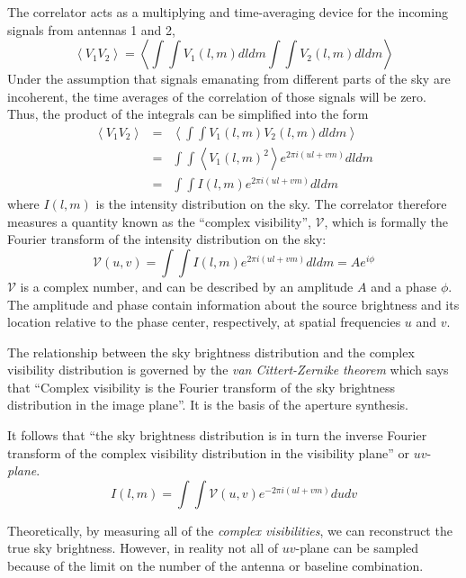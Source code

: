 The correlator acts as a multiplying and time-averaging device for the incoming signals from antennas 1 and 2,
$$\left\langle V_1 V_2 \right\rangle = \left\langle \int\int V_1 (l,m) dl dm  \int\int V_2 (l,m) dl dm \right\rangle$$
Under the assumption that signals emanating from different parts of the sky are incoherent, the time averages of the correlation of those signals will be zero. Thus, the product of the integrals can be simplified into the form 
\begin{eqnarray}
\left\langle V_1 V_2 \right\rangle &=& \left\langle \int\int V_1 (l,m) V_2 (l,m) dl dm \right\rangle \\
&=& \int\int \left\langle V_1 (l,m)^2 \right\rangle e^{2 \pi i (ul + vm)} dl dm \\
&=& \int\int I(l, m) e^{2 \pi i (ul + vm)} dl dm 
\end{eqnarray}
where $I(l, m)$ is the intensity distribution on the sky. The correlator therefore measures a quantity known as the ``complex visibility'', $\mathcal{V}$, which is formally the Fourier transform of the intensity distribution on the sky:
\begin{equation}
\mathcal{V}(u,v) = \int \int I(l, m) e^{2 \pi i (ul + vm)} dl dm = A e^{i\phi}
\end{equation}
$\mathcal{V}$ is a complex number, and can be described by an amplitude $A$ and a phase $\phi$. The amplitude and phase contain information about the source brightness and its location relative to the phase center, respectively, at spatial frequencies $u$ and $v$.

The relationship between the sky brightness distribution and the complex visibility distribution is governed by the \textit{van Cittert-Zernike theorem} which says that ``Complex visibility is the Fourier transform of the sky brightness distribution in the image plane''. It is the basis of the aperture synthesis.

It follows that ``the sky brightness distribution is in turn the inverse Fourier transform of the complex visibility distribution in the visibility plane'' or $uv$-\textit{plane}.
\begin{equation*}
I(l, m) = \int \int \mathcal{V}(u, v) e^{-2 \pi i (ul + vm)} du dv 
\end{equation*}

Theoretically, by measuring all of the \textit{complex visibilities}, we can reconstruct the true sky brightness. However, in reality not all of $uv$-plane can be sampled because of the limit on the number of the antenna or baseline combination. 

